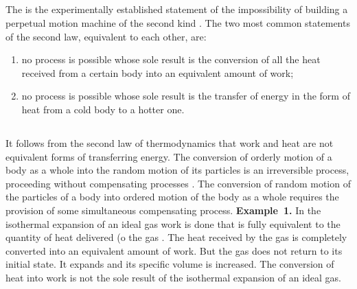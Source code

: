 \subsection{}\label{11.3.2} The  is the experimentally established statement of the impossibility of building a perpe­tual motion machine of the second kind . The two most common statements of the second law, equivalent to each other, are:
\begin{enumerate}[label=(\alph*),noitemsep,nolistsep]
\item no process is possible whose sole result is the conversion of all the heat received from a certain body into an equivalent amount of work;
\item no process is possible whose sole result is the transfer of energy in the form of heat from a cold body to a hotter one. 
\end{enumerate}

\subsection{}\label{11.3.3} It follows from the second law of thermodynamics that work and heat are not equivalent forms of transferring energy. The conversion of orderly motion of a body as a whole into the random motion of its particles is an irreversible process, pro­ceeding without compensating processes . The conver­sion of random motion of the particles of a body into ordered motion of the body as a whole requires the provision of some simultaneous compensating process.
\textbf{Example~1.} In the isothermal expansion of an ideal gas work is done that is fully equivalent to the quantity of heat delivered (o the gas . The heat received by the gas is completely converted into an equivalent amount of work. But the gas does not return to its initial state. It expands and its specific volume is increased. The conversion of heat into work is not the sole result of the isothermal expansion of an ideal gas.



